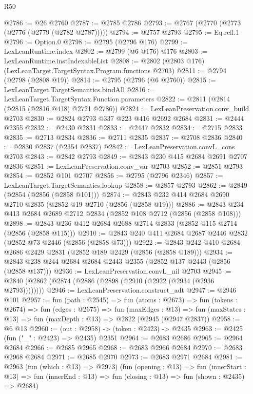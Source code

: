 \begin{lexlean}{R50}
\begin{coremodule}
@2786 := @26 @2760
@2787 := @2785 @2786
@2793 := @2767 (@2770 (@2773 (@2776 (@2779 (@2782 @2787)))))
@2794 := @2757 @2793
@2795 := Eq.refl.{1}
@2796 := Option.{0}
@2798 := @2795 (@2796 @176)
@2799 := LexLeanRuntime.index
@2802 := @2799 (@6 @176) @176
@2803 := LexLeanRuntime.instIndexableList
@2808 := @2802 (@2803 @176) (LexLeanTarget.TargetSyntax.Program.functions @2703)
@2811 := @2794 (@2798 (@2808 @19))
@2814 := @2795 (@2796 (@6 @2760))
@2815 := LexLeanTarget.TargetSemantics.bindAll
@2816 := LexLeanTarget.TargetSyntax.Function.parameters
@2822 := @2811 (@2814 (@2815 (@2816 @418) @2721 @2786))
@2824 := LexLeanPreservation.conv_build @2703
@2830 := @2824 @2793 @337 @223 @416 @2692 @2684
@2831 := @2444 @2355
@2832 := @2430 @2831
@2833 := @2447 @2832
@2834 := @2715 @2833
@2835 := @2713 @2834
@2836 := @2711 @2835
@2837 := @2708 @2836
@2840 := @2830 @2837 (@2354 @2837)
@2842 := LexLeanPreservation.convL_cons @2703
@2843 := @2842 @2793
@2849 := @2843 @230 @415 @2684 @2691 @2707 @2836
@2851 := LexLeanPreservation.conv_var @2703
@2852 := @2851 @2793
@2854 := @2852 @101 @2707
@2856 := @2795 (@2796 @2346)
@2857 := LexLeanTarget.TargetSemantics.lookup
@2858 := @2857 @2793
@2862 := @2849 (@2854 (@2856 (@2858 @101)))
@2874 := @2843 @232 @414 @2684 @2690 @2710 @2835 (@2852 @19 @2710 (@2856 (@2858 @19)))
@2886 := @2843 @234 @413 @2684 @2689 @2712 @2834 (@2852 @108 @2712 (@2856 (@2858 @108)))
@2898 := @2843 @236 @412 @2684 @2688 @2714 @2833 (@2852 @115 @2714 (@2856 (@2858 @115)))
@2910 := @2843 @240 @411 @2684 @2687 @2446 @2832 (@2852 @73 @2446 (@2856 (@2858 @73)))
@2922 := @2843 @242 @410 @2684 @2686 @2429 @2831 (@2852 @189 @2429 (@2856 (@2858 @189)))
@2934 := @2843 @238 @244 @2684 @2684 @2443 @2355 (@2852 @137 @2443 (@2856 (@2858 @137)))
@2936 := LexLeanPreservation.convL_nil @2703
@2945 := @2840 (@2862 (@2874 (@2886 (@2898 (@2910 (@2922 (@2934 (@2936 @2793))))))))
@2946 := LexLeanPreservation.construct_adt
@2947 := @2946 @101
@2957 := fun (path : @2545) =>
  fun (atoms : @2673) =>
  fun (tokens : @2674) =>
  fun (edges : @2675) =>
  fun (maxEdges : @13) =>
  fun (maxStates : @13) => fun (maxDepth : @13) => @2822 (@2945 (@2947 @2837))
@2958 := @6 @13
@2960 := (out : @2958) -> (token : @2423) -> @2435
@2963 := @2425 (fun ("_" : @2423) => @2435) @2351
@2964 := @2683 @2686
@2965 := @2964 @2684
@2966 := @2685 @2965
@2968 := @2683 @2966 @2684
@2970 := @2683 @2968 @2684
@2971 := @2685 @2970
@2973 := @2683 @2971 @2684
@2981 := @2963
    (fun (which : @13) => @2973)
    (fun (opening : @13) =>
    fun (innerStart : @13) =>
    fun (innerEnd : @13) => fun (closing : @13) => fun (shown : @2435) => @2684)

\end{coremodule}
\end{lexlean}
